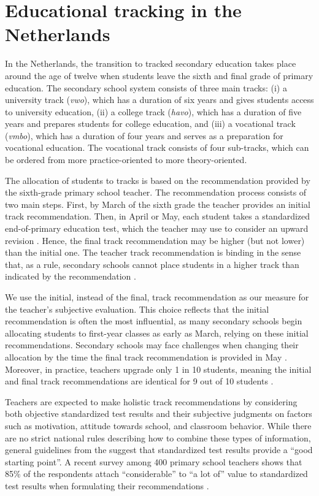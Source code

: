 \section{Educational tracking in the Netherlands}\label{sec:Setting}

In the Netherlands, the transition to tracked secondary education takes place around the age of twelve when students leave the sixth and final grade of primary education. The secondary school system consists of three main tracks: (i) a university track (\textit{vwo}), which has a duration of six years and gives students access to university education, (ii) a college track (\textit{havo}), which has a duration of five years and prepares students for college education, and (iii) a vocational track (\textit{vmbo}), which has a duration of four years and serves as a preparation for vocational education. The vocational track consists of four sub-tracks, which can be ordered from more practice-oriented to more theory-oriented. 

The allocation of students to tracks is based on the recommendation provided by the sixth-grade primary school teacher. The recommendation process consists of two main steps. First, by March of the sixth grade the teacher provides an initial track recommendation. Then, in April or May, each student takes a standardized end-of-primary education test, which the teacher may use to consider an upward revision \citep{wpo2014}. Hence, the final track recommendation may be higher (but not lower) than the initial one. The teacher track recommendation is binding in the sense that, as a rule, secondary schools cannot place students in a higher track than indicated by the recommendation \citep{wvo2014}.

We use the initial, instead of the final, track recommendation as our measure for the teacher's subjective evaluation. This choice reflects that the initial recommendation is often the most influential, as many secondary schools begin allocating students to first-year classes as early as March, relying on these initial recommendations. Secondary schools may face challenges when changing their allocation by the time the final track recommendation is provided in May \citep{inspectorate2019}. Moreover, in practice, teachers upgrade only 1 in 10 students, meaning the initial and final track recommendations are identical for 9 out of 10 students \citep{deree2023quality}.

Teachers are expected to make holistic track recommendations by considering both objective standardized test results and their subjective judgments on factors such as motivation, attitude towards school, and classroom behavior. While there are no strict national rules describing how to combine these types of information, general guidelines from the \cite{ministry2022} suggest that standardized test results provide a ``good starting point''. A recent survey among 400 primary school teachers shows that 85\% of the respondents attach ``considerable'' to ``a lot of'' value to standardized test results when formulating their recommendations \citep{Duo2023}. 

